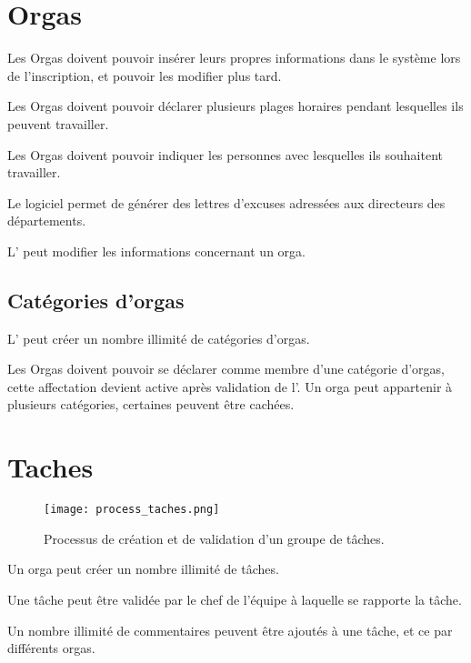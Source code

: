 
\section{Orgas}
Les Orgas doivent pouvoir insérer leurs propres informations dans le système lors de l'inscription, et pouvoir les modifier plus tard.

Les Orgas doivent pouvoir déclarer plusieurs plages horaires pendant lesquelles ils peuvent travailler.

Les Orgas doivent pouvoir indiquer les personnes avec lesquelles ils souhaitent travailler.

Le logiciel permet de générer des lettres d'excuses adressées aux directeurs des départements.


L' \oh{} peut modifier les informations concernant un orga.

\subsection{Catégories d'orgas}
L'\oh{} peut créer un nombre illimité de catégories d'orgas.

Les Orgas doivent pouvoir se déclarer comme membre d'une catégorie d'orgas, cette affectation devient active après validation de l'\oh{}. Un orga peut appartenir à plusieurs catégories, certaines peuvent être cachées.

\section{Taches}

\begin{figure}[h!t]
\centering
\texttt{[image: process\_taches.png]}
\label{fig:ptaches}
\caption{Processus de création et de validation d'un groupe de tâches.}
\end{figure}
\clearpage

Un orga peut créer un nombre illimité de tâches.

Une tâche peut être validée par le chef de l'équipe à laquelle se rapporte la tâche.

Un nombre illimité de commentaires peuvent être ajoutés à une tâche, et ce par différents orgas.



